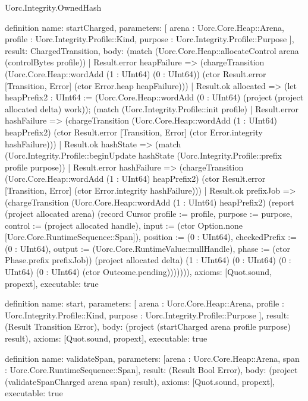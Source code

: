 \begin{lexlean}{Uorc.Integrity.OwnedHash}
\begin{semanticmodule}
definition{
  name: startCharged,
  parameters: [
    arena : Uorc.Core.Heap::Arena,
    profile : Uorc.Integrity.Profile::Kind,
    purpose : Uorc.Integrity.Profile::Purpose
  ],
  result: ChargedTransition,
  body: (match (Uorc.Core.Heap::allocateControl arena (controlBytes profile))
    | Result.error heapFailure => (chargeTransition (Uorc.Core.Heap::wordAdd (1 : UInt64) (0 : UInt64)) (ctor Result.error [Transition, Error] (ctor Error.heap heapFailure)))
    | Result.ok allocated => (let heapPrefix2 : UInt64 := (Uorc.Core.Heap::wordAdd (0 : UInt64) (project (project allocated delta) work)); (match (Uorc.Integrity.Profile::init profile)
      | Result.error hashFailure => (chargeTransition (Uorc.Core.Heap::wordAdd (1 : UInt64) heapPrefix2) (ctor Result.error [Transition, Error] (ctor Error.integrity hashFailure)))
      | Result.ok hashState => (match (Uorc.Integrity.Profile::beginUpdate hashState (Uorc.Integrity.Profile::prefix profile purpose))
        | Result.error hashFailure => (chargeTransition (Uorc.Core.Heap::wordAdd (1 : UInt64) heapPrefix2) (ctor Result.error [Transition, Error] (ctor Error.integrity hashFailure)))
        | Result.ok prefixJob => (chargeTransition (Uorc.Core.Heap::wordAdd (1 : UInt64) heapPrefix2) (report (project allocated arena) (record Cursor {profile := profile, purpose := purpose, control := (project allocated handle), input := (ctor Option.none [Uorc.Core.RuntimeSequence::Span]), position := (0 : UInt64), checkedPrefix := (0 : UInt64), output := (Uorc.Core.RuntimeValue::nullHandle), phase := (ctor Phase.prefix prefixJob)}) (project allocated delta) (1 : UInt64) (0 : UInt64) (0 : UInt64) (0 : UInt64) (ctor Outcome.pending))))))),
  axioms: [Quot.sound, propext],
  executable: true
}

definition{
  name: start,
  parameters: [
    arena : Uorc.Core.Heap::Arena,
    profile : Uorc.Integrity.Profile::Kind,
    purpose : Uorc.Integrity.Profile::Purpose
  ],
  result: (Result Transition Error),
  body: (project (startCharged arena profile purpose) result),
  axioms: [Quot.sound, propext],
  executable: true
}

definition{
  name: validateSpan,
  parameters: [arena : Uorc.Core.Heap::Arena, span : Uorc.Core.RuntimeSequence::Span],
  result: (Result Bool Error),
  body: (project (validateSpanCharged arena span) result),
  axioms: [Quot.sound, propext],
  executable: true
}


\end{semanticmodule}
\end{lexlean}
